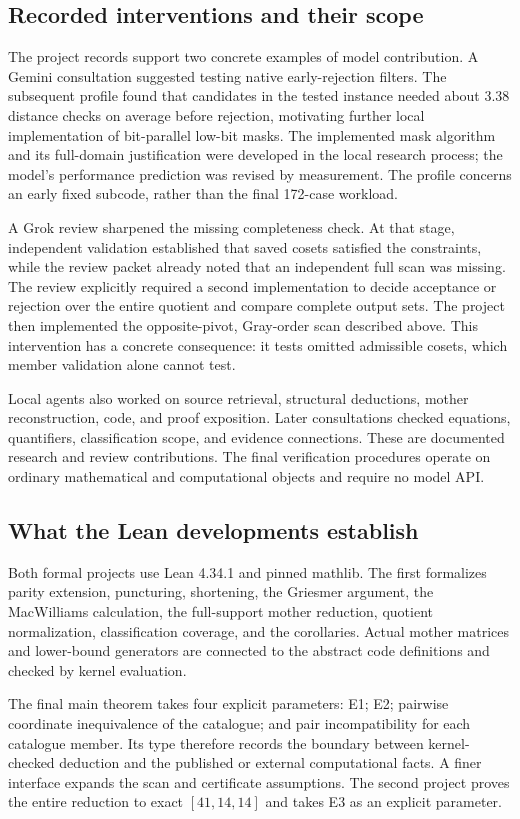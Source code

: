 \subsection{Recorded interventions and their scope}
The project records support two concrete examples of model contribution. A Gemini consultation suggested testing native early-rejection filters. The subsequent profile found that candidates in the tested instance needed about 3.38 distance checks on average before rejection, motivating further local implementation of bit-parallel low-bit masks. The implemented mask algorithm and its full-domain justification were developed in the local research process; the model's performance prediction was revised by measurement. The profile concerns an early fixed subcode, rather than the final 172-case workload.

A Grok review sharpened the missing completeness check. At that stage, independent validation established that saved cosets satisfied the constraints, while the review packet already noted that an independent full scan was missing. The review explicitly required a second implementation to decide acceptance or rejection over the entire quotient and compare complete output sets. The project then implemented the opposite-pivot, Gray-order scan described above. This intervention has a concrete consequence: it tests omitted admissible cosets, which member validation alone cannot test.

Local agents also worked on source retrieval, structural deductions, mother reconstruction, code, and proof exposition. Later consultations checked equations, quantifiers, classification scope, and evidence connections. These are documented research and review contributions. The final verification procedures operate on ordinary mathematical and computational objects and require no model API.

\subsection{What the Lean developments establish}
Both formal projects use Lean 4.34.1 and pinned mathlib. The first formalizes parity extension, puncturing, shortening, the Griesmer argument, the MacWilliams calculation, the full-support mother reduction, quotient normalization, classification coverage, and the corollaries. Actual mother matrices and lower-bound generators are connected to the abstract code definitions and checked by kernel evaluation.

The final main theorem takes four explicit parameters: E1; E2; pairwise coordinate inequivalence of the catalogue; and pair incompatibility for each catalogue member. Its type therefore records the boundary between kernel-checked deduction and the published or external computational facts. A finer interface expands the scan and certificate assumptions. The second project proves the entire reduction to exact $[41,14,14]$ and takes E3 as an explicit parameter.

